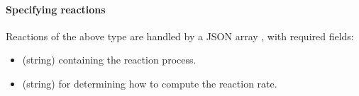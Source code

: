 \documentclass[letterpaper,10pt,english]{sphinxmanual}
\begin{document}
\paragraph{Specifying reactions}
\label{\detokenize{Applications/CdrPlasmaModel:specifying-reactions}}
\sphinxAtStartPar
Reactions of the above type are handled by a JSON array , with required fields:
\begin{itemize}
\item {} 
\sphinxAtStartPar
{} (string) containing the reaction process.

\item {} 
\sphinxAtStartPar
{} (string) for determining how to compute the reaction rate.

\end{itemize}

\begin{sphinxVerbatim}[commandchars=\\\{\},formatcom=\scriptsize]
  \PYG{p}{[}
       
       
       
  \PYG{p}{]}
\end{sphinxVerbatim}
\end{document}
